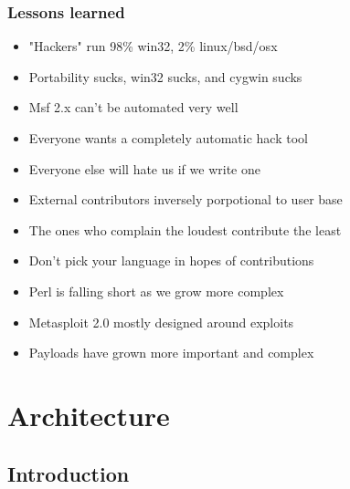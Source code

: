 \documentclass{beamer}
\newenvironment{sitemize}{\vspace{1mm}\begin{itemize}\itemsep 4pt\small}{\end{itemize}}
\begin{document}
\begin{frame}[t]
  \frametitle{Lessons learned}
  
  \begin{sitemize}
    \item "Hackers" run 98\% win32, 2\% linux/bsd/osx
    \item Portability sucks, win32 sucks, and cygwin sucks
  \end{sitemize}
  \pause
  \begin{sitemize}
    \item Msf 2.x can't be automated very well
    \item Everyone wants a completely automatic hack tool
    \pause
    \item Everyone else will hate us if we write one
  \end{sitemize}
  \pause
  \begin{sitemize}
    \item External contributors inversely porpotional to user base
    \item The ones who complain the loudest contribute the least
    \pause
    \item Don't pick your language in hopes of contributions
    \item Perl is falling short as we grow more complex
  \end{sitemize}
  \pause
  \begin{sitemize}
    \item Metasploit 2.0 mostly designed around exploits
    \item Payloads have grown more important and complex
  \end{sitemize}
  
\end{frame}

\section{Architecture}
\subsection{Introduction}
\end{document}
